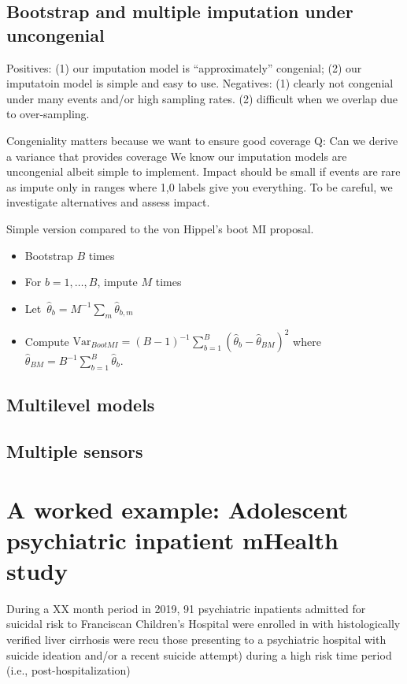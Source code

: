 \documentclass[12pt]{amsart}
\begin{document}
\subsection{Bootstrap and multiple imputation under uncongenial }

Positives: (1) our imputation model is ``approximately'' congenial; (2) our imputatoin model is simple and easy to use.
Negatives: (1) clearly not congenial under many events and/or high sampling rates. (2) difficult when we overlap due to over-sampling.

Congeniality matters because we want to ensure good coverage
Q: Can we derive a variance that provides coverage
We know our imputation models are uncongenial albeit simple to implement.  Impact should be small if events are rare as impute only in ranges where 1,0 labels give you everything.  To be careful, we investigate alternatives and assess impact.

Simple version compared to the von Hippel's boot MI proposal.
\begin{itemize}
\item Bootstrap $B$ times
\item For $b = 1, \ldots, B$, impute $M$ times
\item Let~$\hat \theta_b = M^{-1} \sum_m \hat \theta_{b,m}$
\item Compute $\text{Var}_{BootMI} = (B-1)^{-1} \sum_{b=1}^B (\hat \theta_b - \hat \theta_{BM})^2$ where $\hat \theta_{BM} = B^{-1} \sum_{b=1}^B \hat \theta_b$.
\end{itemize}


\subsection{Multilevel models}

\subsection{Multiple sensors}

\section{A worked example: Adolescent psychiatric inpatient mHealth study} \label{section:example}

During a XX month period in 2019, 91 psychiatric inpatients admitted for suicidal risk to Franciscan Children's Hospital  were enrolled in
 with histologically verified liver cirrhosis were recu
those presenting to a psychiatric hospital with suicide ideation
and/or a recent suicide attempt) during a high risk time period (i.e.,
post-hospitalization)
\end{document}
